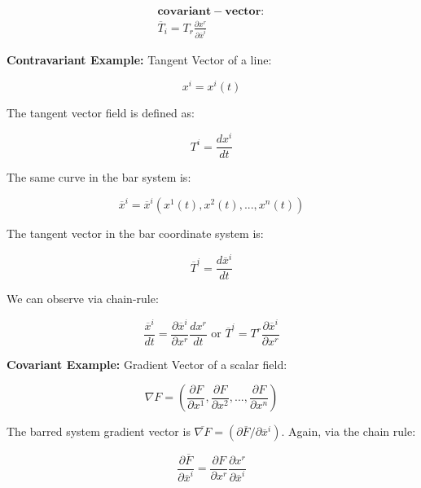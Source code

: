 \documentclass{article}
\begin{document}
\begin{align}
	\mathbf{ covariant-vector: }\\
	\overline{ T }_i = T_r \frac{ \partial x^r }{ \partial \overline{ x }^i }
\end{align}

\noindent
\textbf{Contravariant Example:}
Tangent Vector of a line:

\begin{equation*}
	x^i = x^i(t)
\end{equation*}

The tangent vector field is defined as:

\begin{equation*}
	T^i = \frac{ dx^i }{ dt }
\end{equation*}

The same curve in the bar system is:

\begin{equation*}
	\overline{ x }^i = \overline{ x }^i( x^1(t), x^2(t), ..., x^n(t) )
\end{equation*}

The tangent vector in the bar coordinate system is:

\begin{equation*}
	\overline{ T }^i = \frac{ d \overline{ x }^i }{ dt }
\end{equation*}

We can observe via chain-rule:

\begin{equation*}
	\frac{ \overline{ x }^i }{ dt } = \frac{ \partial \overline{ x }^i }{ \partial x^r } \frac{ dx^r }{ dt } \text{ or } \overline{ T }^i = T^r \frac{ \partial \overline{ x }^i }{ \partial x^r }
\end{equation*}


\noindent
\textbf{Covariant Example:}
Gradient Vector of a scalar field:

\begin{equation*}
	\nabla F = \left( \frac{ \partial F }{ \partial x^1 }, \frac{ \partial F }{ \partial x^2 }, ..., \frac{ \partial F }{ \partial x^n } \right)
\end{equation*}

The barred system gradient vector is $\overline{ \nabla F } = ( \partial \overline{ F } / \partial \overline{ x }^i )$.  Again, via the chain rule:

\begin{equation*}
	\frac{ \partial \overline{ F } }{ \partial \overline{ x }^i } = \frac{ \partial F }{ \partial x^r } \frac{ \partial x^r }{ \partial \overline{ x }^i }
\end{equation*}
\end{document}
